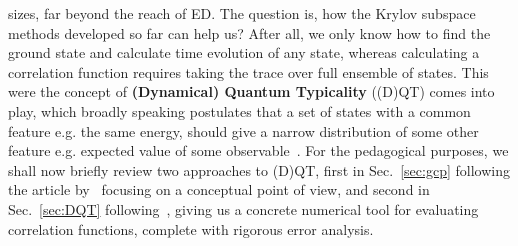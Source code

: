 sizes, far beyond the reach of ED. The question is, how the Krylov subspace methods developed so far can help us?
After all, we only know how to find the ground state and calculate time evolution of any state, whereas
calculating a correlation function requires taking the trace over full ensemble of states. This were the concept 
of \textbf{(Dynamical) Quantum Typicality} ((D)QT) comes into play, which broadly speaking postulates that
a set of states with a common feature e.g. the same energy, should give a narrow distribution of some
other feature e.g. expected value of some observable~\autocite{Bartsch2009a}. For the pedagogical purposes, we shall
now briefly review two approaches to (D)QT, first in Sec.~\ref{sec:gcp} following the article by~\textcite{Popescu2006} focusing
on a conceptual point of view, and second in Sec.~\ref{sec:DQT} following~\textcite{Bartsch2009a,Steinigeweg2014a}, giving us
a concrete numerical tool for evaluating correlation functions, complete with rigorous error analysis.

